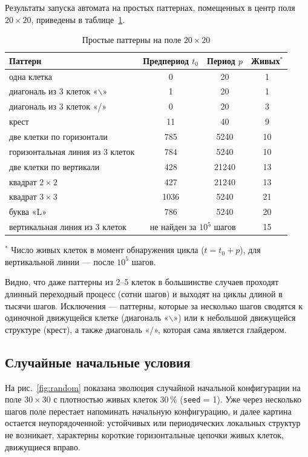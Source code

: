 \documentclass[a4paper,14pt]{extarticle}
\begin{document}
Результаты запуска автомата на простых паттернах, помещенных в центр поля $20 \times 20$, приведены в таблице~\ref{tab:patterns}.

\begin{table}[H]
	\centering
	\caption{Простые паттерны на поле $20 \times 20$}
	\label{tab:patterns}
	\begin{tabular}{|l|c|c|c|}
		\hline
		Паттерн & Предпериод $t_0$ & Период $p$ & Живых$^*$ \\
		\hline
		одна клетка & 0 & 20 & 1 \\
		диагональ из 3 клеток «$\backslash$» & 1 & 20 & 1 \\
		диагональ из 3 клеток «/» & 0 & 20 & 3 \\
		крест & 11 & 40 & 9 \\
		две клетки по горизонтали & 785 & 5240 & 10 \\
		горизонтальная линия из 3 клеток & 784 & 5240 & 10 \\
		две клетки по вертикали & 428 & 21240 & 13 \\
		квадрат $2 \times 2$ & 427 & 21240 & 13 \\
		квадрат $3 \times 3$ & 1036 & 5240 & 21 \\
		буква «L» & 786 & 5240 & 20 \\
		вертикальная линия из 3 клеток & \multicolumn{2}{c|}{не найден за $10^5$ шагов} & 15 \\
		\hline
	\end{tabular}

	\smallskip
	\footnotesize $^*$ Число живых клеток в момент обнаружения цикла ($t = t_0 + p$), для вертикальной линии --- после $10^5$ шагов.
\end{table}

Видно, что даже паттерны из 2--5 клеток в большинстве случаев проходят длинный переходный процесс (сотни шагов) и выходят на циклы длиной в тысячи шагов. Исключения --- паттерны, которые за несколько шагов сводятся к одиночной движущейся клетке (диагональ «$\backslash$») или к небольшой движущейся структуре (крест), а также диагональ «/», которая сама является глайдером.

\subsection{Случайные начальные условия}

На рис.~\ref{fig:random} показана эволюция случайной начальной конфигурации на поле $30 \times 30$ с плотностью живых клеток 30\,\% (\texttt{seed} = 1). Уже через несколько шагов поле перестает напоминать начальную конфигурацию, и далее картина остается неупорядоченной: устойчивых или периодических локальных структур не возникает, характерны короткие горизонтальные цепочки живых клеток, движущиеся вправо.
\end{document}
